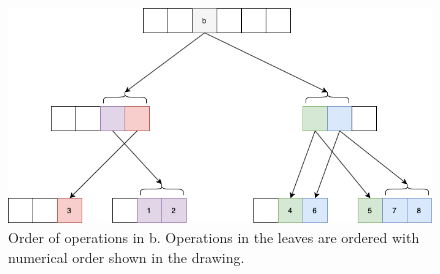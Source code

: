 \documentclass[10pt]{article}
\theoremstyle{definition}
\begin{document}
\begin{figure}[hbt]
  \center\includegraphics[width=5.5in]{pics/tree}
  \caption{Order of operations in b. Operations in the leaves are ordered with numerical order shown in the drawing.}
\end{figure}
\end{document}
